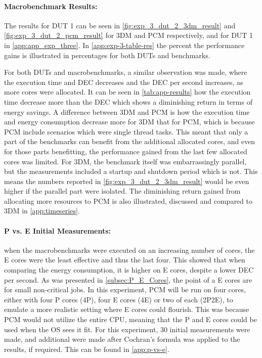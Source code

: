 \paragraph*{Macrobenchmark Results:} The results for DUT 1 can be seen in \cref{fig:exp_3_dut_2_3dm_result} and \cref{fig:exp_3_dut_2_pcm_result} for 3DM and PCM respectively, and for DUT 1 in \cref{app:app_exp_three}. In \cref{app:exp-3-table-res} the percent the performance gains is illustrated in percentages for both DUTs and benchmarks. 



For both DUTs and macrobenchmarks, a similar observation was made, where the execution time and DEC decreases and the DEC per second increases, as more cores were allocated. It can be seen in \cref{tab:app-results} how the execution time decrease more than the DEC which shows a diminishing return in terms of energy savings. A difference between 3DM and PCM is how the execution time and energy consumption decrease more for 3DM that for PCM, which is because PCM include scenarios which were single thread tasks. This meant that only a part of the benchmarks can benefit from the additional allocated cores, and even for those parts benefitting, the performance gained from the last few allocated cores was limited. For 3DM, the benchmark itself was embarrassingly parallel, but the measurements included a startup and shutdown period which is not. This means the numbers reported in \cref{fig:exp_3_dut_2_3dm_result} would be even higher if the parallel part were isolated. The diminishing return gained from allocating more resources to PCM is also illustrated, discussed and compared to 3DM in \cref{app:timeseries}.



\paragraph{P vs. E Initial Measurements:} when the macrobenchmarks were executed on an increasing number of cores, the E cores were the least effective and thus the last four. This showed that when comparing the energy consumption, it is higher on E cores, despite a lower DEC per second. As was presented in \cref{subsec:P_E_Cores}, the point of a E cores are for small non-critical jobs. In this experiment, PCM will be run on four cores, either with four P cores (4P), four E cores (4E) or two of each (2P2E), to emulate a more realistic setting where E cores could flourish. This was because PCM would not utilize the entire CPU, meaning that the P and E cores could be used when the OS sees it fit. For this experiment, $30$ initial measurements were made, and additional were made after Cochran's formula was applied to the results, if required. This can be found in \cref{app:p-vs-e}.


